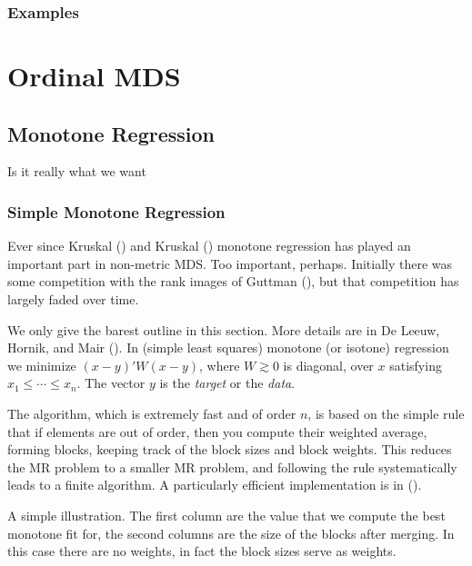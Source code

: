 \documentclass[
  12pt,
  letterpaper,
  DIV=11,
  numbers=noendperiod]{scrreprt}
\theoremstyle{remark}
\begin{document}
\subsection{Examples}\label{examples-1}


\chapter{Ordinal MDS}\label{chapordinal}

\section{Monotone Regression}\label{mathmonreg}

Is it really what we want

\subsection{Simple Monotone Regression}\label{mathsimpiso}

Ever since Kruskal () and Kruskal
() monotone regression has played an
important part in non-metric MDS. Too important, perhaps. Initially
there was some competition with the rank images of Guttman
(), but that competition has largely
faded over time.

We only give the barest outline in this section. More details are in De
Leeuw, Hornik, and Mair ().
In (simple least squares) monotone (or isotone) regression we minimize
\((x-y)'W(x-y)\), where \(W\gtrsim 0\) is diagonal, over \(x\)
satisfying \(x_1\leq\cdots\leq x_n\). The vector \(y\) is the
\emph{target} or the \emph{data}.

The algorithm, which is extremely fast and of order \(n\), is based on
the simple rule that if elements are out of order, then you compute
their weighted average, forming blocks, keeping track of the block sizes
and block weights. This reduces the MR problem to a smaller MR problem,
and following the rule systematically leads to a finite algorithm. A
particularly efficient implementation is in
().

A simple illustration. The first column are the value that we compute
the best monotone fit for, the second columns are the size of the blocks
after merging. In this case there are no weights, in fact the block
sizes serve as weights.
\end{document}
